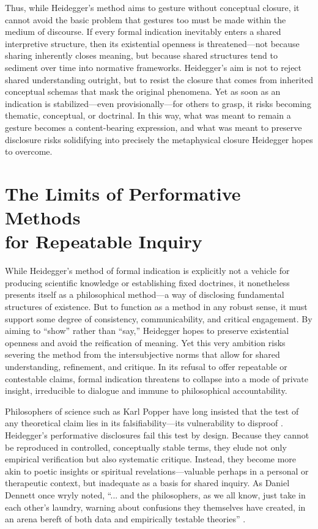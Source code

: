 \documentclass{article}
\begin{document}
Thus, while Heidegger’s method aims to gesture without conceptual closure, it cannot avoid the basic problem that gestures too must be made within the medium of discourse. If every formal indication inevitably enters a shared interpretive structure, then its existential openness is threatened—not because sharing inherently closes meaning, but because shared structures tend to sediment over time into normative frameworks. Heidegger’s aim is not to reject shared understanding outright, but to resist the closure that comes from inherited conceptual schemas that mask the original phenomena. Yet as soon as an indication is stabilized—even provisionally—for others to grasp, it risks becoming thematic, conceptual, or doctrinal. In this way, what was meant to remain a gesture becomes a content-bearing expression, and what was meant to preserve disclosure risks solidifying into precisely the metaphysical closure Heidegger hopes to overcome.

\section*{The Limits of Performative Methods \\ for Repeatable Inquiry}

While Heidegger’s method of formal indication is explicitly not a vehicle for producing scientific knowledge or establishing fixed doctrines, it nonetheless presents itself as a philosophical method—a way of disclosing fundamental structures of existence. But to function as a method in any robust sense, it must support some degree of consistency, communicability, and critical engagement. By aiming to “show” rather than “say,” Heidegger hopes to preserve existential openness and avoid the reification of meaning. Yet this very ambition risks severing the method from the intersubjective norms that allow for shared understanding, refinement, and critique. In its refusal to offer repeatable or contestable claims, formal indication threatens to collapse into a mode of private insight, irreducible to dialogue and immune to philosophical accountability.

Philosophers of science such as Karl Popper have long insisted that the test of any theoretical claim lies in its falsifiability—its vulnerability to disproof \parencite[pp.~39–42]{popper2002}. Heidegger's performative disclosures fail this test by design. Because they cannot be reproduced in controlled, conceptually stable terms, they elude not only empirical verification but also systematic critique. Instead, they become more akin to poetic insights or spiritual revelations—valuable perhaps in a personal or therapeutic context, but inadequate as a basis for shared inquiry. As Daniel Dennett once wryly noted, “... and the philosophers, as we all know, just take in each other’s laundry, warning about confusions they themselves have created, in an arena bereft of both data and empirically testable theories” \parencite[p.~255]{dennett1991}.
\end{document}
